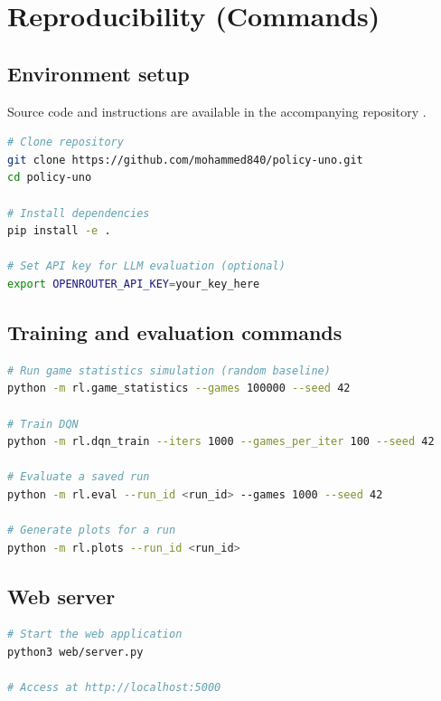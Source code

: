 \documentclass[11pt]{article}
\begin{document}
\FloatBarrier
\clearpage
{}
\printbibliography[heading=bibintoc,title={References}]
\clearpage

\appendix
\section{Reproducibility (Commands)}
\subsection{Environment setup}
Source code and instructions are available in the accompanying repository \parencite{policyuno_repo}.
\begin{lstlisting}[language=bash]
# Clone repository
git clone https://github.com/mohammed840/policy-uno.git
cd policy-uno

# Install dependencies
pip install -e .

# Set API key for LLM evaluation (optional)
export OPENROUTER_API_KEY=your_key_here
\end{lstlisting}

\subsection{Training and evaluation commands}
\begin{lstlisting}[language=bash]
# Run game statistics simulation (random baseline)
python -m rl.game_statistics --games 100000 --seed 42

# Train DQN
python -m rl.dqn_train --iters 1000 --games_per_iter 100 --seed 42

# Evaluate a saved run
python -m rl.eval --run_id <run_id> --games 1000 --seed 42

# Generate plots for a run
python -m rl.plots --run_id <run_id>
\end{lstlisting}

\subsection{Web server}
\begin{lstlisting}[language=bash]
# Start the web application
python3 web/server.py

# Access at http://localhost:5000
\end{lstlisting}
\end{document}
